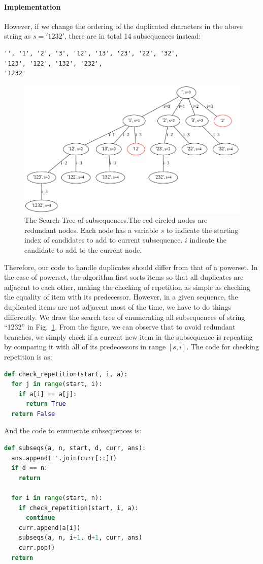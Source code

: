 \documentclass[../main.tex]{subfiles}
\begin{document}
\paragraph{Implementation} However, if we change the ordering of the duplicated characters in the above string as $s='1232'$, there are in total 14 subsequences instead:
\begin{lstlisting}[numbers=none]
'', '1', '2', '3', '12', '13', '23', '22', '32',
'123', '122', '132', '232',
'1232'
\end{lstlisting}
\begin{figure}[!ht]
    \centering
    \includegraphics[width= 1.0\columnwidth]{fig/subsequence.png}
    \caption{The Search Tree of subsequences.The red circled nodes are redundant nodes. Each node has a variable $s$ to indicate the starting index of candidates to add to current subsequence. $i$ indicate the candidate to add to the current node.}
    \label{fig:backtrack_subsequence}
\end{figure}
Therefore, our code to handle duplicates should differ from that of a powerset.  In the case of powerset, the algorithm first sorts items so that all duplicates are adjacent to each other, making the checking of repetition as simple as checking the equality of item with its predecessor. However, in a given sequence, the duplicated items are not adjacent most of the time, we have to do things differently. We draw the search tree of enumerating all subsequences of string ``1232'' in Fig.~\ref{fig:backtrack_subsequence}. From the figure, we can observe that to avoid redundant branches, we simply check if a current new item in the subsequence is repeating by comparing it with all of its predecessors in range $[s, i]$. The code for checking repetition is as:
\begin{lstlisting}[language=Python]
def check_repetition(start, i, a):
  for j in range(start, i):
    if a[i] == a[j]:
      return True
  return False
\end{lstlisting}
And the code to enumerate subsequences is:
\begin{lstlisting}[language=Python]
def subseqs(a, n, start, d, curr, ans):
  ans.append(''.join(curr[::])) 
  if d == n: 
    return
  
  for i in range(start, n):  
    if check_repetition(start, i, a):
      continue    
    curr.append(a[i])
    subseqs(a, n, i+1, d+1, curr, ans)
    curr.pop()
  return
\end{lstlisting}
\end{document}
